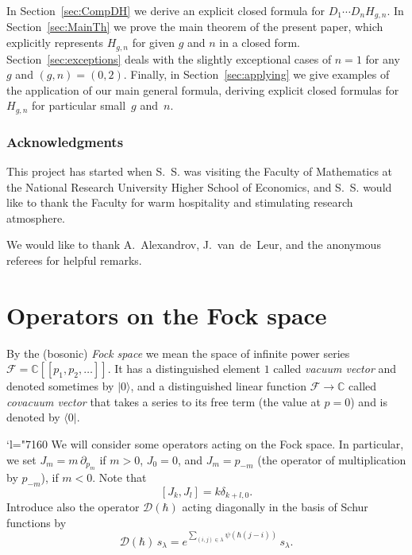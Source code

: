 \documentclass[11pt]{article}
\let\mathcal\mathscr
\newcommand{\llbracket}{[\![}
\newcommand{\rrbracket}{]\!]}
\newcommand{\Changel}{\mathcode`l="7160}
\newcommand{\C}{\mathbb{C}}
\theoremstyle{plain}
\theoremstyle{definition}
\theoremstyle{remark}
\newcommand{\cF}{\mathcal{F}}
\newcommand{\Hc}{H}
\begin{document}
In Section~\ref{sec:CompDH} we derive an explicit closed formula for $D_1\cdots D_n\Hc_{g,n}$. In Section~\ref{sec:MainTh} we prove the main theorem of the present paper, which explicitly represents $\Hc_{g,n}$ for given $g$ and $n$ in a closed form. Section~\ref{sec:exceptions} deals with the slightly exceptional cases of $n=1$ for any $g$ and $(g,n)=(0,2)$. Finally, in Section~\ref{sec:applying} we give examples of the application of our main general formula, deriving explicit closed formulas for $H_{g,n}$ for particular small~$g$ and~$n$.

\subsubsection*{Acknowledgments}
This project has started when S.~S. was visiting the Faculty of Mathematics at the National Research University Higher School of Economics, and S.~S. would like to thank the Faculty for warm hospitality and stimulating research atmosphere.

We would like to thank A.~Alexandrov, J.~van~de~Leur, and the anonymous referees for helpful remarks.

\section{Operators on the Fock space} \label{sec:OperFockSpace}

By the (bosonic) \emph{Fock space} we mean the space of infinite power series $\cF=\C\llbracket p_1,p_2,\dots\rrbracket $. It has a distinguished element $1$ called \emph{vacuum vector} and denoted sometimes by $\big| 0 \big\rangle$, and a distinguished linear function $\cF\to\C$ called \emph{covacuum vector} that takes a series to its free term (the value at $p=0$) and is denoted by $\big\langle 0 \big|$.

\Changel
We will consider some operators acting on the Fock space. In particular, we set $J_m=m\,\partial_{p_m}$ if $m>0$, $J_0=0$, and $J_m=p_{-m}$ (the operator of multiplication by $p_{-m}$), if $m<0$. Note that
\begin{equation}\label{eq:Jcomm}
[J_k, J_l] = k\delta_{k+l,0}.
\end{equation}
Introduce also the operator $\mathcal{D}(\hbar)$ acting diagonally in the basis of Schur functions by
\begin{equation*} \label{eq:action-of-D}
\mathcal{D}(\hbar)\,s_\lambda =
e^{\sum\limits_{(i,j)\in\lambda} \psi(\hbar(j-i))}\,s_\lambda.
\end{equation*}
\end{document}
